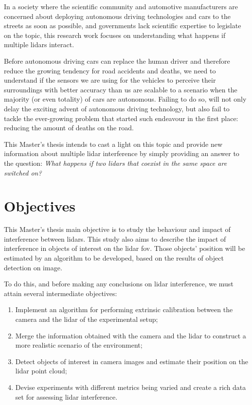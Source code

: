 In a society where the scientific community and automotive manufacturers are concerned about deploying autonomous driving technologies and cars to the streets as soon as possible, and governments lack scientific expertise to legislate on the topic, this research work focuses on understanding what happens if multiple \acp{lidar} interact.

Before autonomous driving cars can replace the human driver and therefore reduce the growing
tendency for road accidents and deaths, we need to understand if the sensors we are using for the vehicles to perceive their surroundings with better accuracy than us are scalable to a scenario when the majority (or even totality) of cars are autonomous. Failing to do so, will not only delay the exciting advent of autonomous driving technology, but also fail to tackle the ever-growing problem that started such endeavour in the first place: reducing the amount of deaths on the road.

This Master's thesis intends to cast a light on this topic and provide new information about multiple \ac{lidar} interference by simply providing an answer to the question: \textit{What happens if two \acp{lidar} that coexist in the same space are switched on?} 


\section{Objectives}
\label{sec:introduction:objectives}
This Master's thesis main objective is to study the behaviour and impact of interference between \acp{lidar}. This study also aims to describe the impact of interference in objects of interest on the \ac{lidar} \acl{fov}. Those objects' position will be estimated by an algorithm to be developed, based on the results of object detection on image.

To do this, and before making any conclusions on \ac{lidar} interference, we must attain several intermediate objectives:
\begin{enumerate}
	\item Implement an algorithm for performing extrinsic calibration between the camera and the \ac{lidar} of the experimental setup;
	\item Merge the information obtained with the camera and the \ac{lidar} to construct a more realistic scenario of the environment;
	\item Detect objects of interest in camera images and estimate their position on the	\ac{lidar} point cloud;
	\item Devise experiments with different metrics being varied and create a rich data set for assessing \ac{lidar} interference.
\end{enumerate}

